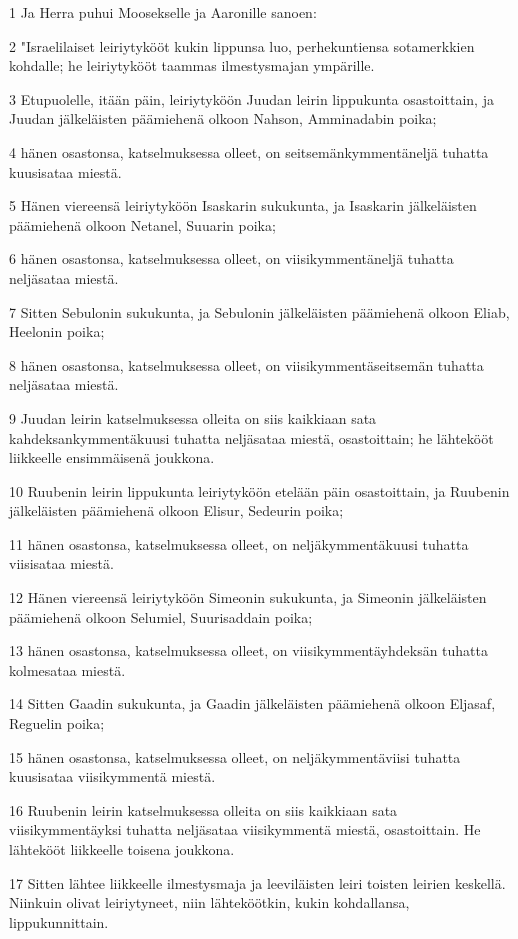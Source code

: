 \par 1 Ja Herra puhui Moosekselle ja Aaronille sanoen:
\par 2 "Israelilaiset leiriytykööt kukin lippunsa luo, perhekuntiensa sotamerkkien kohdalle; he leiriytykööt taammas ilmestysmajan ympärille.
\par 3 Etupuolelle, itään päin, leiriytyköön Juudan leirin lippukunta osastoittain, ja Juudan jälkeläisten päämiehenä olkoon Nahson, Amminadabin poika;
\par 4 hänen osastonsa, katselmuksessa olleet, on seitsemänkymmentäneljä tuhatta kuusisataa miestä.
\par 5 Hänen viereensä leiriytyköön Isaskarin sukukunta, ja Isaskarin jälkeläisten päämiehenä olkoon Netanel, Suuarin poika;
\par 6 hänen osastonsa, katselmuksessa olleet, on viisikymmentäneljä tuhatta neljäsataa miestä.
\par 7 Sitten Sebulonin sukukunta, ja Sebulonin jälkeläisten päämiehenä olkoon Eliab, Heelonin poika;
\par 8 hänen osastonsa, katselmuksessa olleet, on viisikymmentäseitsemän tuhatta neljäsataa miestä.
\par 9 Juudan leirin katselmuksessa olleita on siis kaikkiaan sata kahdeksankymmentäkuusi tuhatta neljäsataa miestä, osastoittain; he lähtekööt liikkeelle ensimmäisenä joukkona.
\par 10 Ruubenin leirin lippukunta leiriytyköön etelään päin osastoittain, ja Ruubenin jälkeläisten päämiehenä olkoon Elisur, Sedeurin poika;
\par 11 hänen osastonsa, katselmuksessa olleet, on neljäkymmentäkuusi tuhatta viisisataa miestä.
\par 12 Hänen viereensä leiriytyköön Simeonin sukukunta, ja Simeonin jälkeläisten päämiehenä olkoon Selumiel, Suurisaddain poika;
\par 13 hänen osastonsa, katselmuksessa olleet, on viisikymmentäyhdeksän tuhatta kolmesataa miestä.
\par 14 Sitten Gaadin sukukunta, ja Gaadin jälkeläisten päämiehenä olkoon Eljasaf, Reguelin poika;
\par 15 hänen osastonsa, katselmuksessa olleet, on neljäkymmentäviisi tuhatta kuusisataa viisikymmentä miestä.
\par 16 Ruubenin leirin katselmuksessa olleita on siis kaikkiaan sata viisikymmentäyksi tuhatta neljäsataa viisikymmentä miestä, osastoittain. He lähtekööt liikkeelle toisena joukkona.
\par 17 Sitten lähtee liikkeelle ilmestysmaja ja leeviläisten leiri toisten leirien keskellä. Niinkuin olivat leiriytyneet, niin lähteköötkin, kukin kohdallansa, lippukunnittain.
